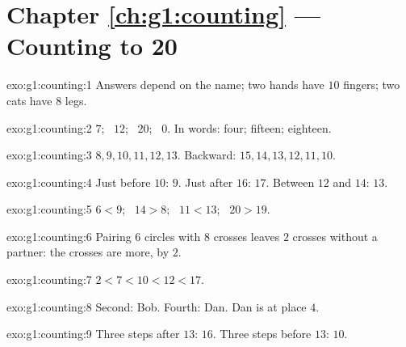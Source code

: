 \section*{Chapter \ref{ch:g1:counting} --- Counting to 20}

\begin{solution}{exo:g1:counting:1}
Answers depend on the name; two hands have $10$ fingers; two cats
have $8$ legs.
\end{solution}

\begin{solution}{exo:g1:counting:2}
$7$; \ $12$; \ $20$; \ $0$. In words: four; fifteen; eighteen.
\end{solution}

\begin{solution}{exo:g1:counting:3}
$8, 9, 10, 11, 12, 13$. Backward: $15, 14, 13, 12, 11, 10$.
\end{solution}

\begin{solution}{exo:g1:counting:4}
Just before $10$: $9$. Just after $16$: $17$. Between $12$ and
$14$: $13$.
\end{solution}

\begin{solution}{exo:g1:counting:5}
$6 < 9$; \ $14 > 8$; \ $11 < 13$; \ $20 > 19$.
\end{solution}

\begin{solution}{exo:g1:counting:6}
Pairing $6$ circles with $8$ crosses leaves $2$ crosses without a
partner: the crosses are more, by $2$.
\end{solution}

\begin{solution}{exo:g1:counting:7}
$2 < 7 < 10 < 12 < 17$.
\end{solution}

\begin{solution}{exo:g1:counting:8}
Second: Bob. Fourth: Dan. Dan is at place $4$.
\end{solution}

\begin{solution}{exo:g1:counting:9}
Three steps after $13$: $16$. Three steps before $13$: $10$.
\end{solution}
